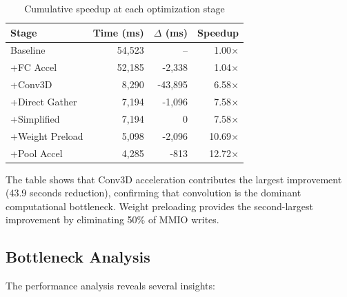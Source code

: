 \documentclass[conference]{IEEEtran}
\begin{document}
\begin{table}[htbp]
\centering
\caption{Cumulative speedup at each optimization stage}
\label{fig:speedup}
\begin{tabular}{|l|r|r|r|}
\hline
\textbf{Stage} & \textbf{Time (ms)} & \textbf{$\Delta$ (ms)} & \textbf{Speedup} \\
\hline
Baseline & 54,523 & -- & 1.00$\times$ \\
+FC Accel & 52,185 & -2,338 & 1.04$\times$ \\
+Conv3D & 8,290 & -43,895 & 6.58$\times$ \\
+Direct Gather & 7,194 & -1,096 & 7.58$\times$ \\
+Simplified & 7,194 & 0 & 7.58$\times$ \\
+Weight Preload & 5,098 & -2,096 & 10.69$\times$ \\
+Pool Accel & 4,285 & -813 & 12.72$\times$ \\
\hline
\end{tabular}
\end{table}

The table shows that Conv3D acceleration contributes the largest improvement (43.9 seconds reduction), confirming that convolution is the dominant computational bottleneck. Weight preloading provides the second-largest improvement by eliminating 50\% of MMIO writes.

\subsection{Bottleneck Analysis}

The performance analysis reveals several insights:
\end{document}

